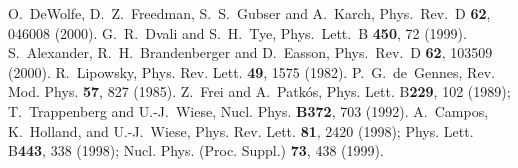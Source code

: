 \documentclass[a4paper,prl,showpacs,twocolumn]{revtex4}
\begin{document}
\begin{thebibliography}{99}
O.~DeWolfe, D.~Z.~Freedman, S.~S.~Gubser and A.~Karch,
Phys.\ Rev.\ D {\bf 62}, 046008 (2000).
G.~R.~Dvali and S.~H.~Tye,
Phys.\ Lett.\ B {\bf 450}, 72 (1999).
S.~Alexander, R.~H.~Brandenberger and D.~Easson,
Phys.\ Rev.\ D {\bf 62}, 103509 (2000).
R.~Lipowsky,
  Phys. Rev. Lett. {\bf 49}, 1575 (1982).
P.~G.~de~Gennes,
  Rev. Mod. Phys. {\bf 57}, 827 (1985).
Z.~Frei and A.~Patk\'os,
  Phys. Lett. B{\bf 229}, 102 (1989);
T.~Trappenberg and U.-J.~Wiese,
  Nucl. Phys. {\bf B372}, 703 (1992).
A.~Campos, K.~Holland, and U.-J.~Wiese,
  Phys. Rev. Lett. {\bf 81}, 2420 (1998);
  Phys. Lett. B{\bf 443}, 338 (1998);
  Nucl. Phys. (Proc. Suppl.) {\bf 73}, 438 (1999).





\end{thebibliography}





\end{document}
